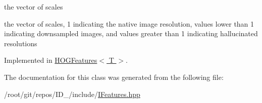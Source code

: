 the vector of scales 

the vector of scales, 1 indicating the native image resolution, values lower than 1 indicating downsampled images, and values greater than 1 indicating hallucinated resolutions 

\-Implemented in \hyperlink{classHOGFeatures_ad9668fda860881c676e1d1bd70adc18c}{\-H\-O\-G\-Features$<$ T $>$}.



\-The documentation for this class was generated from the following file\-:\begin{DoxyCompactItemize}
\item 
/root/git/repos/\-I\-D\-\_/include/\hyperlink{IFeatures_8hpp}{\-I\-Features.\-hpp}\end{DoxyCompactItemize}
